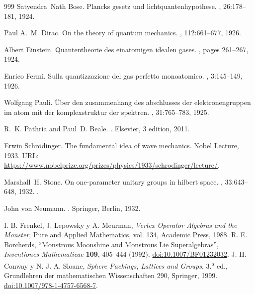 \begin{thebibliography}{999}
Satyendra~Nath Bose.
\newblock Plancks gesetz und lichtquantenhypothese.
, 26:178--181, 1924.

Paul A.~M. Dirac.
\newblock On the theory of quantum mechanics.
, 112:661--677, 1926.

Albert Einstein.
\newblock Quantentheorie des einatomigen idealen gases.
,
  pages 261--267, 1924.

Enrico Fermi.
\newblock Sulla quantizzazione del gas perfetto monoatomico.
, 3:145--149, 1926.

Wolfgang Pauli.
\newblock Über den zusammenhang des abschlusses der elektronengruppen im atom
  mit der komplexstruktur der spektren.
, 31:765--783, 1925.

R.~K. Pathria and Paul~D. Beale.
.
\newblock Elsevier, 3 edition, 2011.

Erwin Schrödinger.
\newblock The fundamental idea of wave mechanics.
\newblock Nobel Lecture, 1933.
\newblock URL:
  \url{https://www.nobelprize.org/prizes/physics/1933/schrodinger/lecture/}.

Marshall~H. Stone.
\newblock On one-parameter unitary groups in hilbert space.
, 33:643--648, 1932.
\newblock \href {https://doi.org/10.2307/1968538} {}.

John von Neumann.
.
\newblock Springer, Berlin, 1932.

 I. B. Frenkel, J. Lepowsky y A. Meurman, \emph{Vertex Operator Algebras and the Monster}, Pure and Applied Mathematics, vol. 134, Academic Press, 1988.
 R. E. Borcherds, ``Monstrous Moonshine and Monstrous Lie Superalgebras'', \emph{Inventiones Mathematicae} \textbf{109}, 405--444 (1992). \href{https://doi.org/10.1007/BF01232032}{doi:10.1007/BF01232032}.
 J. H. Conway y N. J. A. Sloane, \emph{Sphere Packings, Lattices and Groups}, 3.\textsuperscript{a} ed., Grundlehren der mathematischen Wissenschaften 290, Springer, 1999. \href{https://doi.org/10.1007/978-1-4757-6568-7}{doi:10.1007/978-1-4757-6568-7}.



\end{thebibliography}
